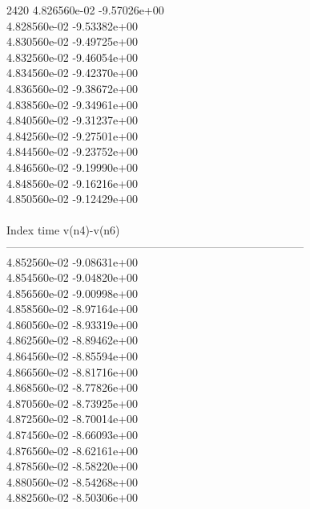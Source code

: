 2420	4.826560e-02	-9.57026e+00	\\ 	4.828560e-02	-9.53382e+00	\\ 	4.830560e-02	-9.49725e+00	\\ 	4.832560e-02	-9.46054e+00	\\ 	4.834560e-02	-9.42370e+00	\\ 	4.836560e-02	-9.38672e+00	\\ 	4.838560e-02	-9.34961e+00	\\ 	4.840560e-02	-9.31237e+00	\\ 	4.842560e-02	-9.27501e+00	\\ 	4.844560e-02	-9.23752e+00	\\ 	4.846560e-02	-9.19990e+00	\\ 	4.848560e-02	-9.16216e+00	\\ 	4.850560e-02	-9.12429e+00	\\ \hline
\\ \hline
Index   time            v(n4)-v(n6)     \\ \hline
--------------------------------------------------------------------------------\\ 	4.852560e-02	-9.08631e+00	\\ 	4.854560e-02	-9.04820e+00	\\ 	4.856560e-02	-9.00998e+00	\\ 	4.858560e-02	-8.97164e+00	\\ 	4.860560e-02	-8.93319e+00	\\ 	4.862560e-02	-8.89462e+00	\\ 	4.864560e-02	-8.85594e+00	\\ 	4.866560e-02	-8.81716e+00	\\ 	4.868560e-02	-8.77826e+00	\\ 	4.870560e-02	-8.73925e+00	\\ 	4.872560e-02	-8.70014e+00	\\ 	4.874560e-02	-8.66093e+00	\\ 	4.876560e-02	-8.62161e+00	\\ 	4.878560e-02	-8.58220e+00	\\ 	4.880560e-02	-8.54268e+00	\\ 	4.882560e-02	-8.50306e+00	\\ \hline
